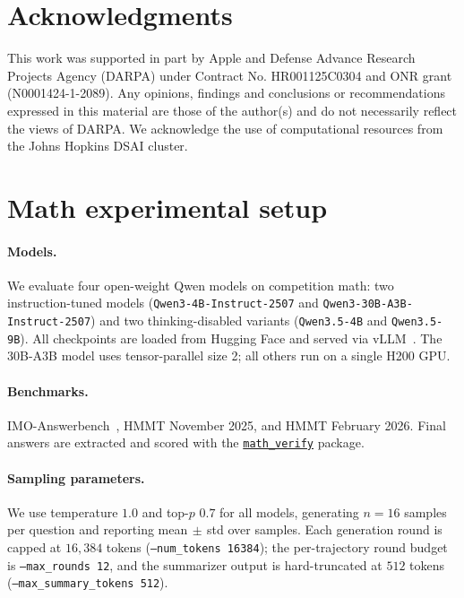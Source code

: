 \documentclass{article}
\begin{document}
\section*{Acknowledgments}
This work was supported in part by Apple and Defense Advance Research Projects Agency
(DARPA) under Contract No.  HR001125C0304
and ONR grant (N0001424-1-2089). 
Any opinions,
findings and conclusions or recommendations expressed in this material are those of the author(s)
and do not necessarily reflect the views of DARPA.
We acknowledge the use of computational resources from the Johns Hopkins DSAI cluster.










\clearpage
\appendix

\section{Math experimental setup}
\label{appendix:math_setup}

\paragraph{Models.} We evaluate four open-weight Qwen models on competition
math: two instruction-tuned models (\texttt{Qwen3-4B-Instruct-2507} and
\texttt{Qwen3-30B-A3B-Instruct-2507}) and two thinking-disabled variants
(\texttt{Qwen3.5-4B} and \texttt{Qwen3.5-9B}). All checkpoints are loaded
from Hugging Face and served via vLLM~\citep{kwon2023efficient}. The
30B-A3B model uses tensor-parallel size 2; all others run on a single H200
GPU.

\paragraph{Benchmarks.} IMO-Answerbench~\citep{luong-etal-2025-towards},
HMMT November 2025, and HMMT February 2026. Final answers are extracted
and scored with the
\href{https://github.com/huggingface/Math-Verify}{\texttt{math\_verify}}
package.

\paragraph{Sampling parameters.} We use temperature $1.0$ and top-$p$
$0.7$ for all models, generating $n=16$ samples per question and
reporting mean$\,\pm\,$std over samples. Each generation round is capped
at $16{,}384$ tokens (\texttt{--num\_tokens 16384}); the per-trajectory
round budget is \texttt{--max\_rounds 12}, and the summarizer output is
hard-truncated at $512$ tokens (\texttt{--max\_summary\_tokens 512}).
\end{document}
